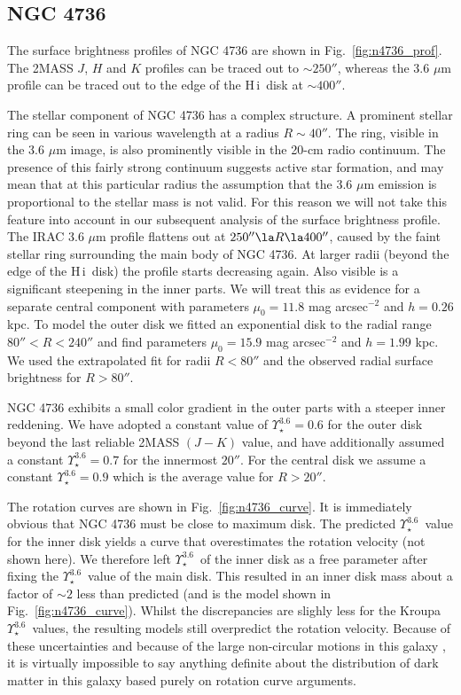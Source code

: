 \documentclass[usenatbib,usegraphicx,apjfonts,floatfix]{emulateapj}
\newcommand{\HI}{H\,{\sc i}}
\newcommand{\Ups}{\ensuremath{\Upsilon_{\star}^{3.6}}}
\begin{document}
\subsection{NGC 4736}

The surface brightness profiles of NGC 4736 are shown in
Fig.~\ref{fig:n4736_prof}. The 2MASS $J$, $H$ and $K$ profiles can be
traced out to $\sim 250''$, whereas the 3.6 $\mu$m profile can be
traced out to the edge of the \HI\ disk at $\sim 400''$.

The stellar component of NGC 4736 has a complex structure.  A
prominent stellar ring can be seen in various wavelength at a radius
$R\sim 40''$. The ring, visible in the 3.6 $\mu$m image, is also
prominently visible in the 20-cm radio continuum.  The presence of
this fairly strong continuum suggests active star formation, and may
mean that at this particular radius the assumption that the 3.6 $\mu$m
emission is proportional to the stellar mass is not valid. For this
reason we will not take this feature into account in our subsequent
analysis of the surface brightness profile.  The IRAC 3.6 $\mu$m
profile flattens out at $250'' \la R \la 400''$, caused by the faint
stellar ring surrounding the main body of NGC 4736.  At larger radii
(beyond the edge of the \HI\ disk) the profile starts decreasing
again.  Also visible is a significant steepening in the inner parts.
We will treat this as evidence for a separate central component with
parameters $\mu_0 = 11.8$ mag arcsec$^{-2}$ and $h= 0.26$ kpc. To
model the outer disk we fitted an exponential disk to the radial range
$80''<R<240''$ and find parameters $\mu_0 = 15.9$ mag arcsec$^{-2}$
and $h=1.99$ kpc. We used the extrapolated fit for radii $R<80''$ and
the observed radial surface brightness for $R>80''$.

NGC 4736 exhibits a small color gradient in the outer parts with a
steeper inner reddening. We have adopted a constant value of $\Ups =
0.6$ for the outer disk beyond the last reliable 2MASS $(J-K)$ value,
and have additionally assumed a constant $\Ups=0.7$ for the innermost
$20''$. For the central disk we assume a constant $\Ups=0.9$ which is
the average value for $R>20''$.

The rotation curves are shown in Fig.~\ref{fig:n4736_curve}. It is
immediately obvious that NGC 4736 must be close to maximum disk. The
predicted \Ups\ value for the inner disk yields a curve that
overestimates the rotation velocity (not shown here). We therefore
left \Ups\ of the inner disk as a free parameter after fixing the
\Ups\ value of the main disk. This resulted in an inner disk mass
about a factor of $\sim 2$ less than predicted (and is the model shown
in Fig.~\ref{fig:n4736_curve}).  Whilst the discrepancies are slighly
less for the Kroupa \Ups\ values, the resulting models still
overpredict the rotation velocity.  Because of these uncertainties and
because of the large non-circular motions in this galaxy
\citep{clemens2007}, it is virtually impossible to say anything
definite about the distribution of dark matter in this galaxy based
purely on rotation curve arguments.
\end{document}
